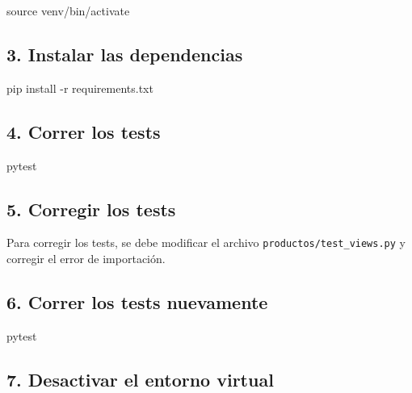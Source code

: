 \documentclass[
  a4paper,
  DIV=11,
  numbers=noendperiod,
  onepage,
  openany]{scrreprt}
\newenvironment{Shaded}{\begin{snugshade}}{\end{snugshade}}
\newcommand{\NormalTok}[1]{\textcolor[rgb]{0.00,0.23,0.31}{#1}}
\begin{document}
\begin{tcolorbox}
\begin{Shaded}
\begin{Highlighting}[]
\NormalTok{source venv/bin/activate}
\end{Highlighting}
\end{Shaded}

\subsection{3. Instalar las
dependencias}\label{instalar-las-dependencias}

\begin{Shaded}
\begin{Highlighting}[]
\NormalTok{pip install {-}r requirements.txt}
\end{Highlighting}
\end{Shaded}

\subsection{4. Correr los tests}\label{correr-los-tests}

\begin{Shaded}
\begin{Highlighting}[]
\NormalTok{pytest}
\end{Highlighting}
\end{Shaded}

\subsection{5. Corregir los tests}\label{corregir-los-tests}

Para corregir los tests, se debe modificar el archivo
\texttt{productos/test\_views.py} y corregir el error de importación.

\subsection{6. Correr los tests
nuevamente}\label{correr-los-tests-nuevamente}

\begin{Shaded}
\begin{Highlighting}[]
\NormalTok{pytest}
\end{Highlighting}
\end{Shaded}

\subsection{7. Desactivar el entorno
virtual}\label{desactivar-el-entorno-virtual}


\end{tcolorbox}
\end{document}
